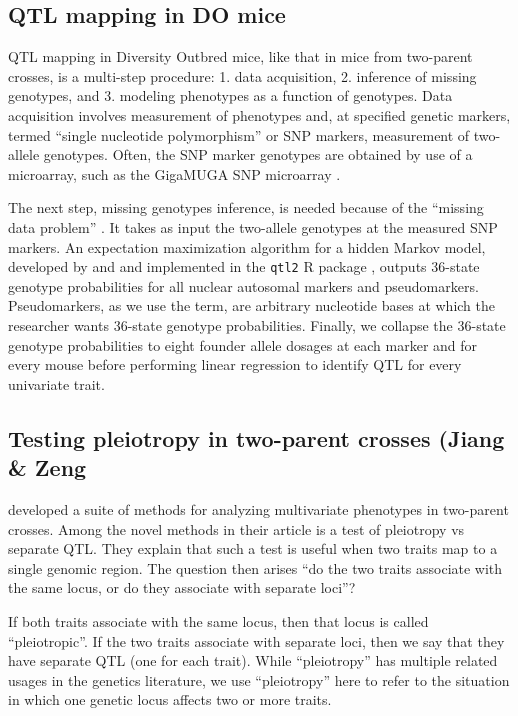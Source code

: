 \documentclass[]{article}
\begin{document}
\subsection{QTL mapping in DO mice}

QTL mapping in Diversity Outbred mice, like that in mice from two-parent crosses, is a multi-step procedure: 1. data acquisition, 2. inference of missing genotypes, and 3. modeling phenotypes as a function of genotypes. Data acquisition involves measurement of phenotypes and, at specified genetic markers, termed ``single nucleotide polymorphism'' or SNP markers, measurement of two-allele genotypes. Often, the SNP marker genotypes are obtained by use of a microarray, such as the GigaMUGA SNP microarray \citep{morgan2015mouse}. 

The next step, missing genotypes inference, is needed because of the ``missing data problem'' \citep{broman2009guide}. It takes as input the two-allele genotypes at the measured SNP markers. An expectation maximization algorithm \citep{dempster1977maximum} for a hidden Markov model, developed by \citet{broman2012haplotype} and \citet{broman2012genotype} and implemented in the \texttt{qtl2} R package \citep{broman2019rqtl2}, outputs 36-state genotype probabilities for all nuclear autosomal markers and pseudomarkers. Pseudomarkers, as we use the term, are arbitrary nucleotide bases at which the researcher wants 36-state genotype probabilities. Finally, we collapse the 36-state genotype probabilities to eight founder allele dosages at each marker and for every mouse before performing linear regression to identify QTL for every univariate trait. 



\subsection{Testing pleiotropy in two-parent crosses (Jiang \& Zeng}

\citet{jiang1995multiple} developed a suite of methods for analyzing multivariate phenotypes in two-parent crosses. Among the novel methods in their article is a test of pleiotropy vs separate QTL. They explain that such a test is useful when two traits map to a single genomic region. The question then arises ``do the two traits associate with the same locus, or do they associate with separate loci''?

If both traits associate with the same locus, then that locus is called ``pleiotropic''. If the two traits associate with separate loci, then we say that they have separate QTL (one for each trait). While ``pleiotropy'' has multiple related usages in the genetics literature, we use ``pleiotropy'' here to refer to the situation in which one genetic locus affects two or more traits. 
\end{document}
